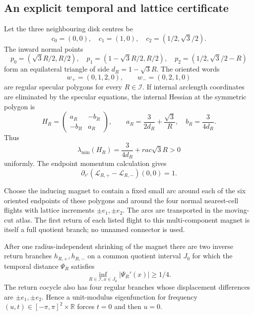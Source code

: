\subsection{An explicit temporal and lattice certificate}

Let the three neighbouring disk centres be
\[
 c_0=(0,0),\quad c_1=(1,0),\quad
 c_2=(1/2,\sqrt3/2).
\]
The inward normal points
\[
 p_0=(\sqrt3R/2,R/2),\quad
 p_1=(1-\sqrt3R/2,R/2),\quad
 p_2=(1/2,\sqrt3/2-R)
\]
form an equilateral triangle of side
\(d_R=1-\sqrt3R\).  The oriented words
\[
 w_+=(0,1,2,0),\qquad w_-=(0,2,1,0)
\]
are regular specular polygons for every \(R\in\mathcal I\).  If internal
arclength coordinates are eliminated by the specular equations, the internal
Hessian at the symmetric polygon is
\[
 H_R=
 \begin{pmatrix}
 a_R&-b_R\\-b_R&a_R
 \end{pmatrix},
 \qquad
 a_R=\frac{3}{2d_R}+\frac{\sqrt3}{R},
 \quad b_R=\frac{3}{4d_R}.
\]
Thus
\[
 \lambda_{\min}(H_R)=\frac{3}{4d_R}+rac{\sqrt3}{R}>0
\]
uniformly.  The endpoint momentum calculation gives
\[
 \partial_{r'}(\mathscr L_{R,+}-\mathscr L_{R,-})(0,0)=1.
\]

Choose the inducing magnet to contain a fixed small arc around each of the six
oriented endpoints of these polygons and around the four normal nearest-cell
flights with lattice increments \(\pm e_1,\pm e_2\).  The arcs are transported
in the moving-cut atlas.  The first return of each listed flight to this
multi-component magnet is itself a full quotient branch; no unnamed connector
is used.

\begin{lemma}
\label{lem:r5-a2-certificate}
After one radius-independent shrinking of the magnet there are two inverse
return branches \(h_{R,+},h_{R,-}\) on a common quotient interval \(J_0\)
for which the temporal distance \(\Psi_R\) satisfies
\[
 \inf_{R\in\mathcal I,x\in J_0}|\Psi_R'(x)|\ge1/4.
\]
The return cocycle also has four regular branches whose displacement
differences are \(\pm e_1,\pm e_2\).  Hence a unit-modulus eigenfunction for
frequency \((u,t)\in[-\pi,\pi]^2\times\mathbb R\) forces \(t=0\) and then
\(u=0\).
\end{lemma}


